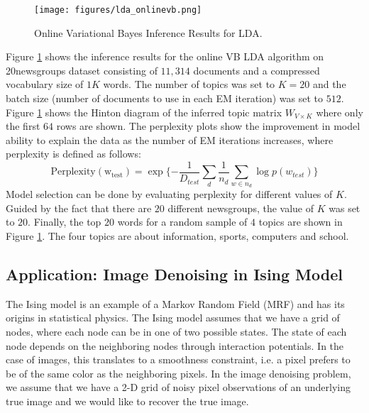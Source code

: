 \begin{figure}[tbhp]
    \centering
    \texttt{[image: figures/lda\_onlinevb.png]}
    \caption{Online Variational Bayes Inference Results for LDA.}
    \label{fig:lda_onlinevb}
\end{figure}

Figure \ref{fig:lda_onlinevb} shows the inference results for the online VB LDA algorithm on 20newsgroups dataset consisting of $11,314$ documents and a compressed vocabulary size of $1K$ words. The number of topics was set to $K=20$ and the batch size (number of documents to use in each EM iteration) was set to $512$. Figure \ref{fig:lda_onlinevb} shows the Hinton diagram of the inferred topic matrix $W_{V\times K}$ where only the first $64$ rows are shown. The perplexity plots show the improvement in model ability to explain the data as the number of EM iterations increases, where perplexity is defined as follows:
\begin{equation}\label{equ:perplexity1}
   \mathrm{Perplexity(w_{test})} = \exp\{-\frac{1}{D_{test}}\sum_{d} \frac{1}{n_d} \sum_{w \in n_d} \log p(w_{test})\}
\end{equation}
Model selection can be done by evaluating perplexity for different values of $K$. Guided by the fact that there are $20$ different newsgroups, the value of $K$ was set to $20$. Finally, the top $20$ words for a random sample of $4$ topics are shown in Figure \ref{fig:lda_onlinevb}. The four topics are about information, sports, computers and school.\\

\subsection{Application: Image Denoising in Ising Model}

The Ising model is an example of a Markov Random Field (MRF) and has its origins in statistical physics. The Ising model assumes that we have a grid of nodes, where each node can be in one of two possible states. The state of each node depends on the neighboring nodes through interaction potentials. In the case of images, this translates to a smoothness constraint, i.e. a pixel prefers to be of the same color as the neighboring pixels. In the image denoising problem, we assume that we have a 2-D grid of noisy pixel observations of an underlying true image and we would like to recover the true image.\\


